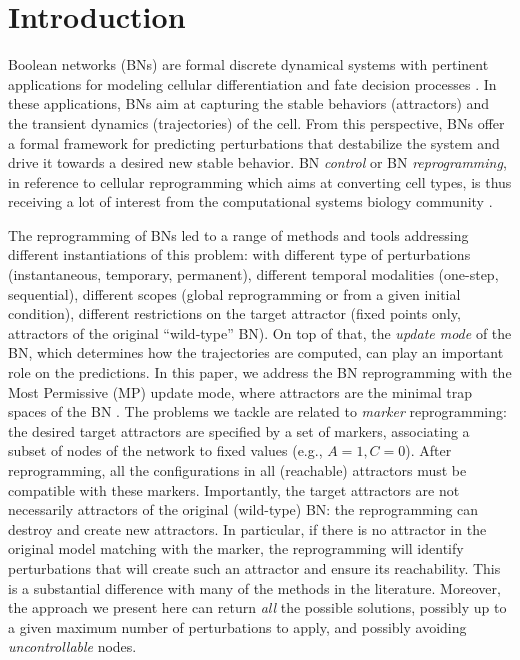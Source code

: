 \documentclass[PCJ,Unicode,screen,mode=plain]{cedram}
\begin{document}
\tableofcontents

\section*{Introduction}

Boolean networks (BNs) are formal discrete dynamical systems with
pertinent applications for modeling cellular differentiation and fate
decision processes
\citep{Saez-Rodriguez2009,Cohen2015,Schwab2021,Zanudo21,Montagud22}. In
these applications, BNs aim at capturing the stable behaviors
(attractors) and the transient dynamics (trajectories) of the cell. From
this perspective, BNs offer a formal framework for predicting
perturbations that destabilize the system and drive it towards a desired
new stable behavior. BN \emph{control} or BN \emph{reprogramming}, in
reference to cellular reprogramming which aims at converting cell types,
is thus receiving a lot of interest from the computational systems
biology community
\citep{Zanudo2015,Yang2018,Biane2018,Mandon2019,Cifuentes2020,Su2020,Rozum2021}.

The reprogramming of BNs led to a range of methods and tools addressing
different instantiations of this problem: with different type of
perturbations (instantaneous, temporary, permanent), different temporal
modalities (one-step, sequential), different scopes (global
reprogramming or from a given initial condition), different restrictions
on the target attractor (fixed points only, attractors of the original
``wild-type'' BN). On top of that, the \emph{update mode} of the BN,
which determines how the trajectories are computed, can play an
important role on the predictions.
In this paper, we address the BN reprogramming with the Most Permissive
(MP) update mode, where attractors are the minimal trap spaces of the BN
\citep{Pauleve2020}. The problems we tackle are related to \emph{marker}
reprogramming: the desired target attractors are specified by a set of
markers, associating a subset of nodes of the network to fixed values
(e.g., \(A=1,C=0\)). After reprogramming, all the configurations in all
(reachable) attractors must be compatible with these markers.
Importantly, the target attractors are not necessarily attractors of the
original (wild-type) BN: the reprogramming can destroy and create new
attractors. In particular, if there is no attractor in the original
model matching with the marker, the reprogramming will identify
perturbations that will create such an attractor and ensure its
reachability. This is a substantial difference with many of the methods
in the literature. Moreover, the approach we present here can return
\emph{all} the possible solutions, possibly up to a given maximum number
of perturbations to apply, and possibly avoiding \emph{uncontrollable}
nodes.
\end{document}
